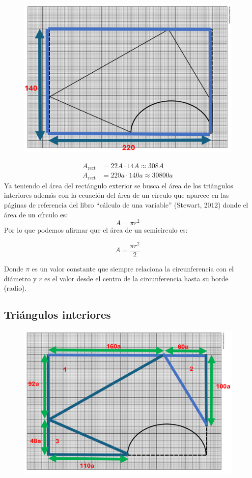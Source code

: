 \documentclass[12pt]{article}
\begin{document}
\begin{figure}[H]
    \centering
    \includegraphics[width=0.5\linewidth]{imagen 1.png}

\end{figure}    

\begin{align*}
A_\text{rect} &= 22A \cdot 14A \approx 308A \\
A_\text{rect} &= 220a \cdot 140a \approx 30800a
\end{align*}
Ya teniendo el área del rectángulo exterior se busca el área de los triángulos interiores además con la ecuación del área de un círculo que aparece en las páginas de referencia del libro “cálculo de una variable” (Stewart, 2012) donde el área de un círculo es:
\[A = {\pi r^2}\]
Por lo que podemos afirmar que el área de un semicirculo es:


\[A = {\frac{\pi r^2}{2}}\]

Donde $\pi$ es un valor constante que siempre relaciona la circunferencia con el diámetro y $r$ es el valor desde el centro de la circunferencia hasta su borde (radio).



\subsection{Triángulos interiores}

\begin{figure}[H]
    \centering
    \includegraphics[width=0.5\linewidth]{imagen 2.png}
\end{figure}
\end{document}
